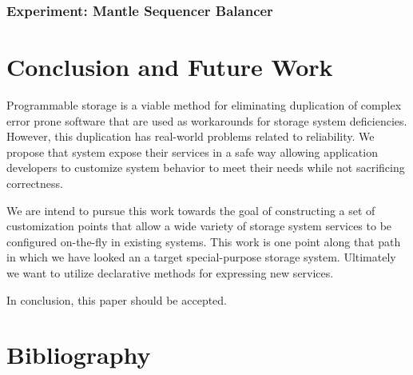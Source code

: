 \documentclass[10pt,twocolumn]{article}
\begin{document}
\subsubsection{Experiment: Mantle Sequencer
Balancer}\label{experiment-mantle-sequencer-balancer}

\section{Conclusion and Future Work}\label{conclusion-and-future-work}

Programmable storage is a viable method for eliminating duplication of
complex error prone software that are used as workarounds for storage
system deficiencies. However, this duplication has real-world problems
related to reliability. We propose that system expose their services in
a safe way allowing application developers to customize system behavior
to meet their needs while not sacrificing correctness.

We are intend to pursue this work towards the goal of constructing a set
of customization points that allow a wide variety of storage system
services to be configured on-the-fly in existing systems. This work is
one point along that path in which we have looked an a target
special-purpose storage system. Ultimately we want to utilize
declarative methods for expressing new services.

In conclusion, this paper should be accepted.

\section{Bibliography}\label{bibliography}
\end{document}
